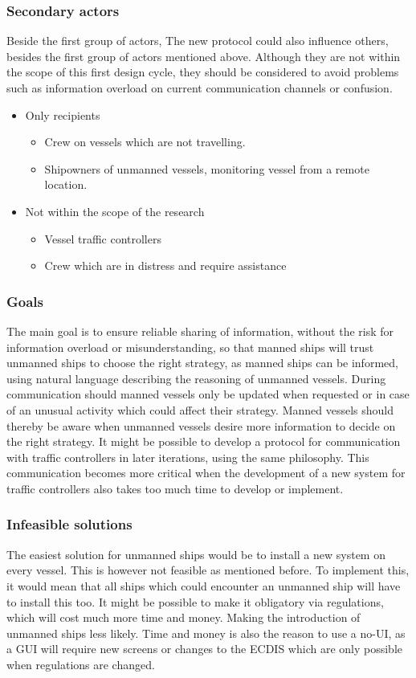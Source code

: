 \subsubsection{Secondary actors}
Beside the first group of actors, The new protocol could also influence others, besides the first group of actors mentioned above. Although they are not within the scope of this first design cycle, they should be considered to avoid problems such as information overload on current communication channels or confusion. 
\begin{itemize}
	\item Only recipients
	\begin{itemize}
		\item Crew on vessels which are not travelling.
		\item Shipowners of unmanned vessels, monitoring vessel from a remote location.
	\end{itemize}
	\item Not within the scope of the research
	\begin{itemize}
		\item Vessel traffic controllers
		\item Crew which are in distress and require assistance
	\end{itemize}
\end{itemize}

\subsubsection{Goals}
The main goal is to ensure reliable sharing of information, without the risk for information overload or misunderstanding, so that manned ships will trust unmanned ships to choose the right strategy, as manned ships can be informed, using natural language describing the reasoning of unmanned vessels. 
During communication should manned vessels only be updated when requested or in case of an unusual activity which could affect their strategy. Manned vessels should thereby be aware when unmanned vessels desire more information to decide on the right strategy.
It might be possible to develop a protocol for communication with traffic controllers in later iterations, using the same philosophy. This communication becomes more critical when the development of a new system for traffic controllers also takes too much time to develop or implement.

\subsubsection{Infeasible solutions}
The easiest solution for unmanned ships would be to install a new system on every vessel. This is however not feasible as mentioned before. To implement this, it would mean that all ships which could encounter an unmanned ship will have to install this too. It might be possible to make it obligatory via regulations, which will cost much more time and money. Making the introduction of unmanned ships less likely.
Time and money is also the reason to use a \ac{no-UI}, as a GUI will require new screens or changes to the \ac{ECDIS} which are only possible when regulations are changed.

